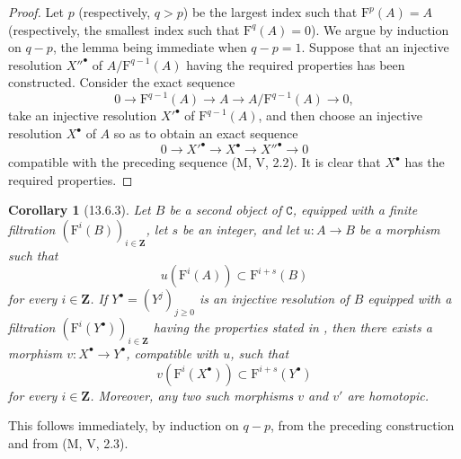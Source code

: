 \documentclass[oneside]{amsart}
\theoremstyle{ega-env-style}
\theoremstyle{ega-thm-env-style}
\newtheorem*{corollary}{Corollary}
\theoremstyle{ega-defn-env-style}
\def\bb{\mathbf}                    %
\def\cat{\mathtt}                   %
\def\geq{\geqslant}                 %
\let\EGAOriginalLabel\label
\renewcommand{\label}[1]{\phantomsection\EGAOriginalLabel{#1}}
\begin{document}
\begin{proof}
Let $p$ (respectively, $q>p$) be the largest index such that
$\mathrm{F}^p(A)=A$ (respectively, the smallest index such that
$\mathrm{F}^q(A)=0$).
We argue by induction on $q-p$, the lemma being immediate when
$q-p=1$.
Suppose that an injective resolution ${X''}^\bullet$ of
$A/\mathrm{F}^{q-1}(A)$ having the required properties has been
constructed.
Consider the exact sequence
\[
  0\longrightarrow\mathrm{F}^{q-1}(A)
  \longrightarrow A
  \longrightarrow A/\mathrm{F}^{q-1}(A)
  \longrightarrow0,
\]
take an injective resolution ${X'}^\bullet$ of
$\mathrm{F}^{q-1}(A)$, and then choose an injective resolution
$X^\bullet$ of $A$ so as to obtain an exact sequence
\[
  0\longrightarrow {X'}^\bullet
  \longrightarrow X^\bullet
  \longrightarrow {X''}^\bullet
  \longrightarrow0
\]
compatible with the preceding sequence (M, V, 2.2).
It is clear that $X^\bullet$ has the required properties.
\end{proof}

\begin{corollary}[13.6.3]
\label{0.13.6.3}
Let $B$ be a second object of $\cat{C}$, equipped with a finite
filtration $(\mathrm{F}^i(B))_{i\in\bb{Z}}$, let $s$ be an integer,
and let $u:A\longrightarrow B$ be a morphism such that
\[
  u(\mathrm{F}^i(A))\subset\mathrm{F}^{i+s}(B)
\]
for every $i\in\bb{Z}$.
If $Y^\bullet=(Y^j)_{j\geq0}$ is an injective resolution of $B$
equipped with a filtration
$(\mathrm{F}^i(Y^\bullet))_{i\in\bb{Z}}$ having the properties stated
in , then there exists a morphism
$v:X^\bullet\longrightarrow Y^\bullet$, compatible with $u$, such
that
\[
  v(\mathrm{F}^i(X^\bullet))
  \subset
  \mathrm{F}^{i+s}(Y^\bullet)
\]
for every $i\in\bb{Z}$.
Moreover, any two such morphisms $v$ and $v'$ are homotopic.
\end{corollary}

This follows immediately, by induction on $q-p$, from the preceding
construction and from (M, V, 2.3).
\end{document}
